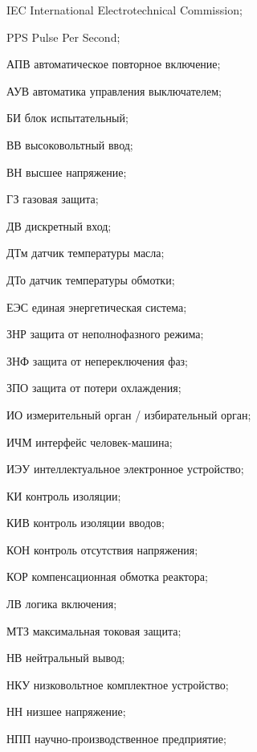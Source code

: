 \begin{list}{}%
{%
  \setlength{\labelwidth}{\abbrwidth}%
  \setlength{\labelsep}{0pt}%
  \setlength{\leftmargin}{\dimexpr\labelwidth+\labelsep\relax}%
  \setlength{\itemindent}{0pt}%
  \setlength{\parsep}{0pt}%
  \setlength{\itemsep}{0pt}
  \renewcommand{\makelabel}[1]{#1 --\hspace{\abbrgap}}%
}
\item[IEC]  International Electrotechnical Commission;
\item[PPS] Pulse Per Second;
\item[АПВ] автоматическое повторное включение;
\item[АУВ] автоматика управления выключателем;
\item[БИ] блок испытательный;
\item[ВВ] высоковольтный ввод;
\item[ВН] высшее напряжение;
\item[ГЗ] газовая защита;
\item[ДВ] дискретный вход;
\item[ДТм] датчик температуры масла;
\item[ДТо] датчик температуры обмотки;
\item[ЕЭС] единая энергетическая система;
\item[ЗНР] защита от неполнофазного режима;
\item[ЗНФ] защита от непереключения фаз;
\item[ЗПО] защита от потери охлаждения;
\item[ИО] измерительный орган / избирательный орган;
\item[ИЧМ] интерфейс человек-машина;
\item[ИЭУ] интеллектуальное электронное устройство;
\item[КИ] контроль изоляции;
\item[КИВ] контроль изоляции вводов;
\item[КОН] контроль отсутствия напряжения;
\item[КОР] компенсационная обмотка реактора;
\item[ЛВ] логика включения;
\item[МТЗ] максимальная токовая защита;
\item[НВ] нейтральный вывод;
\item[НКУ] низковольтное комплектное устройство;
\item[НН] низшее напряжение;
\item[НПП] научно-производственное предприятие;

\end{list}
